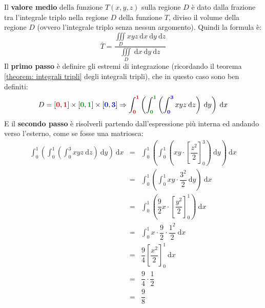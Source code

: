 \documentclass[a4paper]{article}
\begin{document}
	\noindent
	Il \textbf{valore medio} della funzione $T\left(x,y,z\right)$ sulla regione $D$ è dato dalla frazione tra l'integrale triplo nella regione $D$ della funzione $T$, diviso il volume della regione $D$ (ovvero l'integrale triplo senza nessun argomento). Quindi la formula è:
	\begin{equation*}
		\overline{T} = \dfrac{
			\displaystyle\iiint\limits_{D} xyz \:\mathrm{d}x\:\mathrm{d}y\:\mathrm{d}z
		}{
			\displaystyle\iiint\limits_{D} \:\mathrm{d}x\:\mathrm{d}y\:\mathrm{d}z
		}
	\end{equation*}
	Il \textbf{primo passo} è definire gli estremi di integrazione (ricordando il teorema \ref{theorem: integrali tripli} degli integrali tripli), che in questo caso sono ben definiti:
	\begin{equation*}
		D = 
		\left[\textcolor{Red3}{\mathbf{0}},\textcolor{Red3}{\mathbf{1}}\right] \times 
		\left[\textcolor{Green4}{\mathbf{0}},\textcolor{Green4}{\mathbf{1}}\right] \times 
		\left[\textcolor{Blue2}{\mathbf{0}},\textcolor{Blue2}{\mathbf{3}}\right] 
		\Rightarrow
		\displaystyle\int_{\textcolor{Red3}{\mathbf{0}}}^{\textcolor{Red3}{\mathbf{1}}} \left(\int_{\textcolor{Green4}{\mathbf{0}}}^{\textcolor{Green4}{\mathbf{1}}} \left(\int_{\textcolor{Blue2}{\mathbf{0}}}^{\textcolor{Blue2}{\mathbf{3}}} xyz \:\mathrm{d}z\right) \: \mathrm{d}y\right) \:\mathrm{d}x
	\end{equation*}
	E il \textbf{secondo passo} è risolverli partendo dall'espressione più interna ed andando verso l'esterno, come se fosse una matriosca:
	\begin{equation*}
		\begin{array}{rcl}
			\displaystyle\int_{0}^{1} \left(\int_{0}^{1} \left(\int_{0}^{3} xyz \:\mathrm{d}z\right) \: \mathrm{d}y\right) \:\mathrm{d}x
			&=&
			\displaystyle\int_{0}^{1} \left(\int_{0}^{1} \left( xy \cdot \left[\dfrac{z^{2}}{2}\right]_{0}^{3} \right) \: \mathrm{d}y\right) \:\mathrm{d}x \\ [1.5em]
			&=&
			\displaystyle\int_{0}^{1} \left(\int_{0}^{1} xy \cdot \dfrac{3^{2}}{2} \: \mathrm{d}y\right) \:\mathrm{d}x \\ [1.5em]
			&=&
			\displaystyle\int_{0}^{1} \left(\dfrac{9}{2}x \cdot \left[\dfrac{y^{2}}{2}\right]_{0}^{1} \right) \:\mathrm{d}x \\ [1.5em]
			&=&
			\displaystyle\int_{0}^{1} x \cdot \dfrac{9}{2} \cdot \dfrac{1^{2}}{2} \:\mathrm{d}x \\ [1.5em]
			&=&
			\dfrac{9}{4} \left[\dfrac{x^{2}}{2}\right]_{0}^{1} \:\mathrm{d}x \\ [1.5em]
			&=&
			\dfrac{9}{4} \cdot \dfrac{1}{2} \\ [1em]
			&=& 
			\dfrac{9}{8}
		\end{array}
	\end{equation*}\newpage
\end{document}
